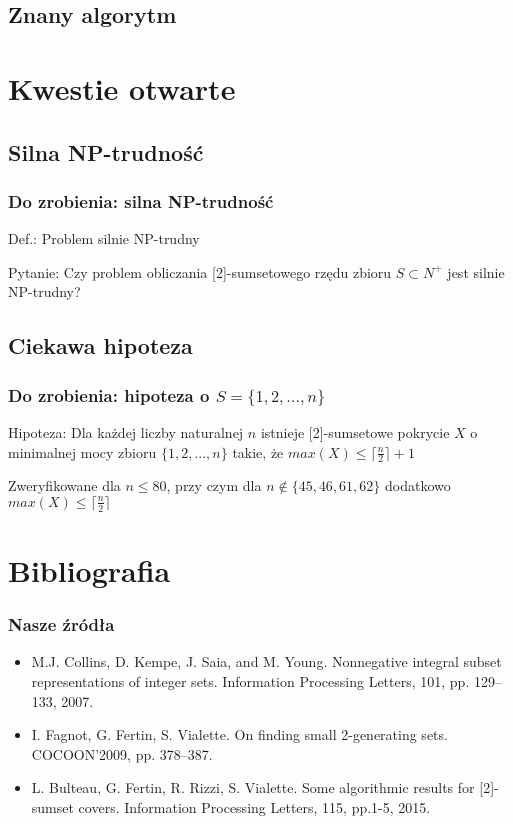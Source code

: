 \documentclass{beamer}
\begin{document}
	\subsection{Znany algorytm}
		\begin{frame}
		\end{frame}
		
\section{Kwestie otwarte}
	\subsection{Silna NP-trudność}
		\begin{frame} \frametitle{Do zrobienia: silna NP-trudność}
			Def.: Problem silnie NP-trudny
			
			Pytanie: Czy problem obliczania [2]-sumsetowego rzędu zbioru $ S \subset N^{+} $ jest silnie NP-trudny?
		\end{frame}
		
	\subsection{Ciekawa hipoteza}
		\begin{frame} \frametitle{Do zrobienia: hipoteza o $ S = \lbrace 1,2,...,n \rbrace $}
			Hipoteza: Dla każdej liczby naturalnej $ n $ istnieje [2]-sumsetowe pokrycie $ X $ o minimalnej mocy zbioru $ \lbrace 1,2,...,n \rbrace $ takie, że $ max(X) \leq \lceil \frac{n}{2} \rceil + 1 $
			
			Zweryfikowane dla $ n \leq 80 $, przy czym dla $ n \notin \lbrace 45,46,61,62 \rbrace $ dodatkowo $ max(X) \leq \lceil \frac{n}{2} \rceil $
		\end{frame}

\section{Bibliografia}
	\begin{frame} \frametitle{Nasze źródła}
		\begin{itemize}
			\item M.J. Collins, D. Kempe, J. Saia, and M. Young. Nonnegative integral
subset representations of integer sets. Information Processing Letters, 101, pp. 129–133, 2007.
			\item I. Fagnot, G. Fertin, S. Vialette. On finding small 2-generating sets. COCOON'2009, pp. 378–387.
			\item L. Bulteau, G. Fertin, R. Rizzi, S. Vialette. Some algorithmic results
for [2]-sumset covers. Information Processing Letters, 115, pp.1-5, 2015.
		\end{itemize}
	\end{frame}
	
\end{document}
